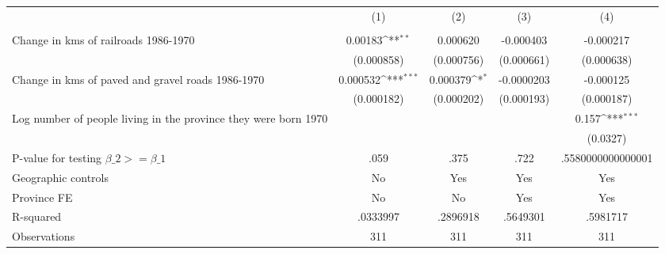 {
\def\sym#1{\ifmmode^{#1}\else\(^{#1}\)\fi}
\begin{tabular}{l*{4}{c}}
\hline\hline
                &\multicolumn{1}{c}{(1)}&\multicolumn{1}{c}{(2)}&\multicolumn{1}{c}{(3)}&\multicolumn{1}{c}{(4)}\\
                &\multicolumn{1}{c}{}&\multicolumn{1}{c}{}&\multicolumn{1}{c}{}&\multicolumn{1}{c}{}\\
\hline
Change in kms of railroads 1986-1970&  0.00183\sym{**} & 0.000620         &-0.000403         &-0.000217         \\
                &(0.000858)         &(0.000756)         &(0.000661)         &(0.000638)         \\
[1em]
Change in kms of paved and gravel roads 1986-1970& 0.000532\sym{***}& 0.000379\sym{*}  &-0.0000203         &-0.000125         \\
                &(0.000182)         &(0.000202)         &(0.000193)         &(0.000187)         \\
[1em]
Log number of people living in the province they were born 1970&                  &                  &                  &    0.157\sym{***}\\
                &                  &                  &                  & (0.0327)         \\
\hline
P-value for testing $\beta\_{2} >= \beta\_{1}$&     .059         &     .375         &     .722         &.5580000000000001         \\
Geographic controls&       No         &      Yes         &      Yes         &      Yes         \\
Province FE     &       No         &       No         &      Yes         &      Yes         \\
R-squared       & .0333997         & .2896918         & .5649301         & .5981717         \\
Observations    &      311         &      311         &      311         &      311         \\
\hline\hline
\end{tabular}
}
